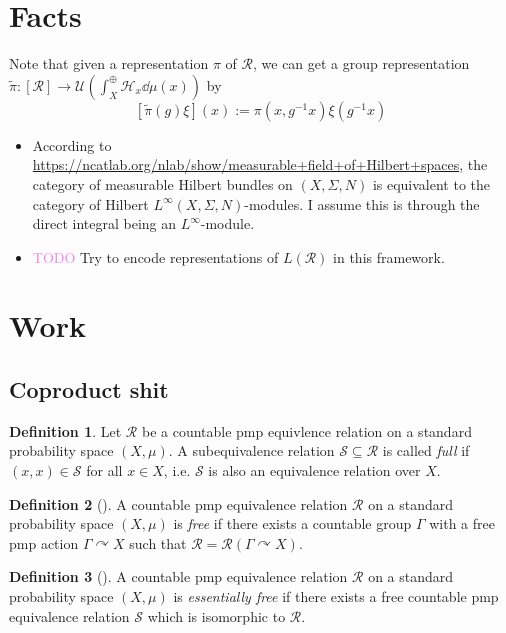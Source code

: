 \documentclass[12pt,letterpaper]{article}
\newcommand{\sub}{\subseteq}
\newcommand{\lr}[1]{\left(#1\right)}
\renewcommand{\H}{\mathcal{H}}
\newcommand{\acts}{\curvearrowright}
\theoremstyle{definition}
\newtheorem{definition}{Definition}[]
\theoremstyle{plain}
\theoremstyle{remark}
\begin{document}
\section{Facts}

Note that given a representation $ \pi $ of $ \mathcal{R} $, we can get a group representation $ \widetilde{\pi}:[\mathcal{R}]\to \mathcal{U}\lr{\int_{X}^{\oplus}\H_{x}\dd{\mu(x)}} $ by 
\[
    [\widetilde{\pi}(g) \xi](x) := \pi(x,g^{-1}x) \xi(g^{-1}x)
\]

\begin{itemize}
    \item According to \url{https://ncatlab.org/nlab/show/measurable+field+of+Hilbert+spaces}, the category of measurable Hilbert bundles on $ (X,\Sigma, N) $ is equivalent to the category of Hilbert $ L^{\infty}(X,\Sigma, N) $-modules. I assume this is through the direct integral being an $ L^\infty $-module.
    \item \textcolor{violet}{TODO} Try to encode representations of $ L(\mathcal{R}) $ in this framework.
\end{itemize}

\section{Work}
\subsection{Coproduct shit}

\begin{definition}
    Let $ \mathcal{R} $ be a countable pmp equivlence relation on a standard probability space $ (X,\mu) $. A subequivalence relation $ \mathcal{S}\sub \mathcal{R} $ is called \textit{full} if $ (x,x)\in \mathcal{S} $ for all $ x\in X $, i.e. $ \mathcal{S} $ is also an equivalence relation over $ X $.
\end{definition}

\begin{definition}[\textcite{borelequivnotes}]
    A countable pmp equivalence relation $ \mathcal{R} $ on a standard probability space $ (X,\mu) $ is \textit{free} if there exists a countable group $ \Gamma $ with a free pmp action $ \Gamma \acts X $ such that $ \mathcal{R} = \mathcal{R}(\Gamma\acts X) $.
\end{definition}

\begin{definition}[\textcite{borelequivnotes}]
    A countable pmp equivalence relation $ \mathcal{R} $ on a standard probability space $ (X,\mu) $ is \textit{essentially free} if there exists a free countable pmp equivalence relation $ \mathcal{S} $ which is isomorphic to $ \mathcal{R} $.
\end{definition}
\end{document}
